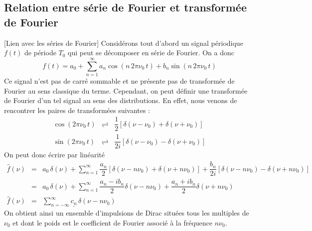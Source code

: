 \subsection{Relation entre série de Fourier et transformée de Fourier}[Lien avec les séries de Fourier] %
\label{sub:relation_entre_serie_de_fourier_et_transformee_de_fourier}
Considérons tout d'abord un signal périodique \(f(t)\) de période \(T_0\) qui peut se décomposer en série de Fourier. On a donc
\[
f(t)=a_{0}+\sum_{n=1}^{\infty}a_{n}\cos(n\, 2\pi \nu_0\, t)+b_{n}\sin(n\, 2\pi \nu_0 \, t)
\]
Ce signal n'est pas de carré sommable et ne présente pas de transformée de Fourier au sens classique du terme. Cependant, on peut définir une transformée de Fourier d'un tel signal au sens des distributions. En effet, nous venons de rencontrer les paires de transformées suivantes :
\[\begin{array}{lcr}
	\cos(2\pi\nu_0\, t) &\rightleftharpoons& \dfrac12 \left[\delta(\nu-\nu_0)+\delta(\nu+\nu_0)\right]\\[3mm]
	\sin(2\pi\nu_0\, t) &\rightleftharpoons& \dfrac{1}{2i}\left[\delta(\nu-\nu_0)-\delta(\nu+\nu_0)\right]
\end{array}
\]
On peut donc écrire par linéarité
\[
\begin{array}{rcl}
\widehat{f}(\nu)&=&\displaystyle
a_{0}\,\delta(\nu)+\sum_{n=1}^{\infty}\dfrac{a_{n}}{2}\left[\delta(\nu-n\nu_0)+\delta(\nu+n\nu_0)\right]+
\dfrac{b_{n}}{2i}\left[\delta(\nu-n\nu_0)-\delta(\nu+n\nu_0)\right]\\[3mm]

&=&\displaystyle
a_{0}\,\delta(\nu)+\sum_{n=1}^{\infty}\dfrac{a_{n}-ib_n}{2} \delta(\nu-n\nu_0)+\dfrac{a_n+ib_n}{2}\delta(\nu+n\nu_0)\\[3mm]

\widehat{f}(\nu)&=&\displaystyle\sum_{n=-\infty}^{\infty}\underline{c_n}\, \delta(\nu-n\nu_0)
\end{array}
\]
On obtient ainsi un ensemble d'impulsions de Dirac situées tous les multiples de \(\nu_0\) et dont le poids est le coefficient de Fourier associé à la fréquence \(n \nu_0\).
